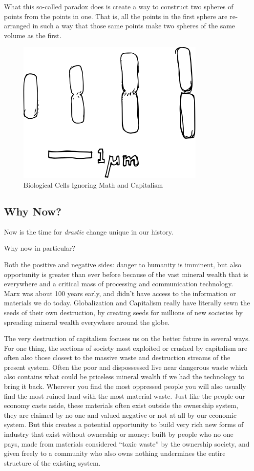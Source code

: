 What this so-called paradox does is create a way to construct two
spheres of points from the points in one. That is, all the points in the
first sphere are re-arranged in such a way that those same points make
two spheres of the same volume as the first.

\begin{figure}[htbp]
\centering
\includegraphics{images/ecoli.png}
\caption{Biological Cells Ignoring Math and Capitalism}
\end{figure}

\subsection{Why Now?}\label{why-now}

Now is the time for \emph{drastic} change unique in our history.

Why now in particular?

Both the positive and negative sides: danger to humanity is imminent,
but also opportunity is greater than ever before because of the vast
mineral wealth that is everywhere and a critical mass of processing and
communication technology. Marx was about 100 years early, and didn't
have access to the information or materials we do today. Globalization
and Capitalism really have literally sewn the seeds of their own
destruction, by creating seeds for millions of new societies by
spreading mineral wealth everywhere around the globe.

The very destruction of capitalism focuses us on the better future in
several ways. For one thing, the sections of society most exploited or
crushed by capitalism are often also those closest to the massive waste
and destruction streams of the present system. Often the poor and
dispossessed live near dangerous waste which also contains what could be
priceless mineral wealth if we had the technology to bring it back.
Wherever you find the most oppressed people you will also usually find
the most ruined land with the most material waste. Just like the people
our economy casts aside, these materials often exist outside the
ownership system, they are claimed by no one and valued negative or not
at all by our economic system. But this creates a potential opportunity
to build very rich new forms of industry that exist without ownership or
money: built by people who no one pays, made from materials considered
``toxic waste'' by the ownership society, and given freely to a
community who also owns nothing undermines the entire structure of the
existing system.

